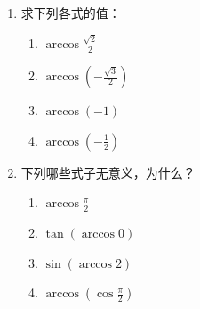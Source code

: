\begin{enumerate}
    \item 求下列各式的值：
\begin{multicols}{2}
\begin{enumerate}[(1)]
    \item $\arccos \frac{\sqrt{2}}{2}$
    \item $\arccos \left(-\frac{\sqrt{3}}{2}\right)$
    \item $\arccos (-1)$
    \item $\arccos \left(-\frac{1}{2}\right)$
\end{enumerate}
\end{multicols}
    \item 下列哪些式子无意义，为什么？
\begin{multicols}{2}
\begin{enumerate}[(1)]
    \item $\arccos \frac{\pi}{2}$
    \item $\tan(\arccos 0)$
    \item $\sin(\arccos 2)$
    \item $\arccos\left(\cos\frac{\pi}{2}\right) $
    

\end{enumerate}
\end{multicols}
\end{enumerate}
